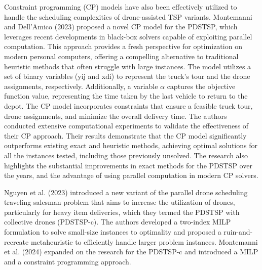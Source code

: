\documentclass{article}
\begin{document}
	\par
	Constraint programming (CP) models have also been effectively utilized to handle the scheduling complexities of drone-assisted TSP variants. 
	Montemanni and Dell’Amico (2023) proposed a novel CP model for the PDSTSP, which leverages recent developments in black-box solvers capable of exploiting parallel computation. This approach provides a fresh perspective for optimization on modern personal computers, offering a compelling alternative to traditional heuristic methods that often struggle with large instances. The model utilizes a set of binary variables (yij and xdi) to represent the truck's tour and the drone assignments, respectively. Additionally, a variable $\alpha$ captures the objective function value, representing the time taken by the last vehicle to return to the depot. The CP model incorporates constraints that ensure a feasible truck tour, drone assignments, and minimize the overall delivery time. The authors conducted extensive computational experiments to validate the effectiveness of their CP approach. Their results demonstrate that the CP model significantly outperforms existing exact and heuristic methods, achieving optimal solutions for all the instances tested, including those previously unsolved. The research also highlights the substantial improvements in exact methods for the PDSTSP over the years, and the advantage of using parallel computation in modern CP solvers.
	\par
	Nguyen et al. (2023) introduced a new variant of the parallel drone scheduling traveling salesman problem that aims to increase the utilization of drones, particularly for heavy item deliveries, which they termed the PDSTSP with collective drones (PDSTSP-c).
	The authors developed a two-index MILP formulation to solve small-size instances to optimality and proposed a ruin-and-recreate metaheuristic to efficiently handle larger problem instances. Montemanni et al. (2024) expanded on the research for the PDSTSP-c and introduced a MILP and a constraint programming approach.
	\par
\end{document}
